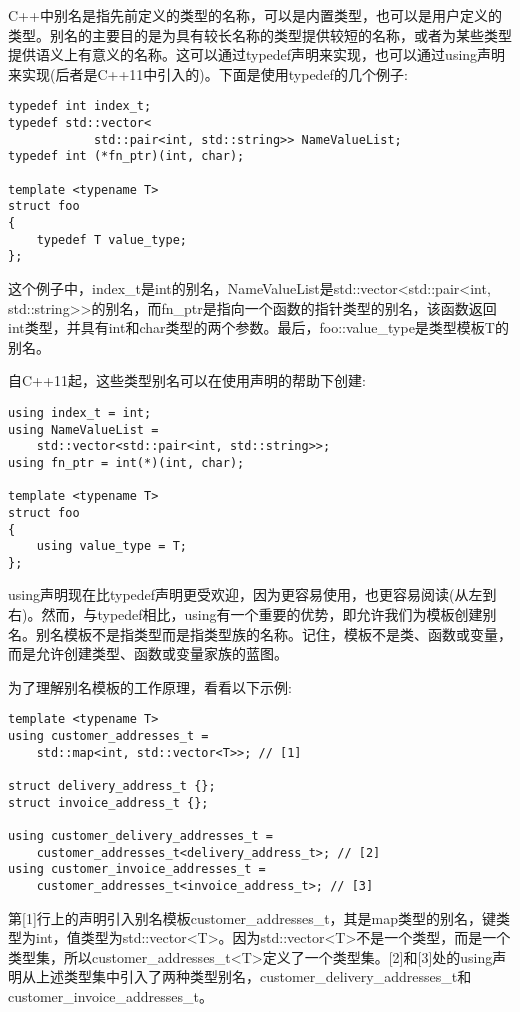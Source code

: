 C++中别名是指先前定义的类型的名称，可以是内置类型，也可以是用户定义的类型。别名的主要目的是为具有较长名称的类型提供较短的名称，或者为某些类型提供语义上有意义的名称。这可以通过typedef声明来实现，也可以通过using声明来实现(后者是C++11中引入的)。下面是使用typedef的几个例子:

\begin{lstlisting}[style=styleCXX]
typedef int index_t;
typedef std::vector<
			std::pair<int, std::string>> NameValueList;
typedef int (*fn_ptr)(int, char);

template <typename T>
struct foo
{
	typedef T value_type;
};
\end{lstlisting}

这个例子中，index\_t是int的别名，NameValueList是std::vector<std::pair<int, std::string>{}>的别名，而fn\_ptr是指向一个函数的指针类型的别名，该函数返回int类型，并具有int和char类型的两个参数。最后，foo::value\_type是类型模板T的别名。

自C++11起，这些类型别名可以在使用声明的帮助下创建:

\begin{lstlisting}[style=styleCXX]
using index_t = int;
using NameValueList =
	std::vector<std::pair<int, std::string>>;
using fn_ptr = int(*)(int, char);

template <typename T>
struct foo
{
	using value_type = T;
};
\end{lstlisting}

using声明现在比typedef声明更受欢迎，因为更容易使用，也更容易阅读(从左到右)。然而，与typedef相比，using有一个重要的优势，即允许我们为模板创建别名。别名模板不是指类型而是指类型族的名称。记住，模板不是类、函数或变量，而是允许创建类型、函数或变量家族的蓝图。

为了理解别名模板的工作原理，看看以下示例:

\begin{lstlisting}[style=styleCXX]
template <typename T>
using customer_addresses_t =
	std::map<int, std::vector<T>>; // [1]
	
struct delivery_address_t {};
struct invoice_address_t {};

using customer_delivery_addresses_t =
	customer_addresses_t<delivery_address_t>; // [2]
using customer_invoice_addresses_t =
	customer_addresses_t<invoice_address_t>; // [3]
\end{lstlisting}

第[1]行上的声明引入别名模板customer\_addresses\_t，其是map类型的别名，键类型为int，值类型为std::vector<T>。因为std::vector<T>不是一个类型，而是一个类型集，所以customer\_addresses\_t<T>定义了一个类型集。[2]和[3]处的using声明从上述类型集中引入了两种类型别名，customer\_delivery\_addresses\_t和customer\_invoice\_addresses\_t。


